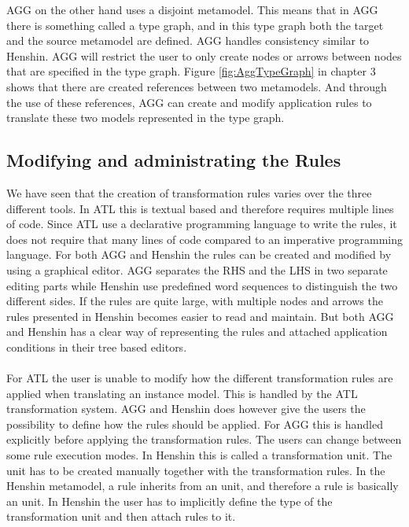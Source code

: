 \documentclass[pdftex,11pt,a4paper]{article}
\begin{document}
AGG on the other hand uses a disjoint metamodel. This means that in AGG there
is something called a type graph, and in this type graph both the target and
the source metamodel are defined. AGG handles consistency similar to
Henshin. AGG will restrict the user to only create nodes or arrows between
nodes that are specified in the type graph. Figure \ref{fig:AggTypeGraph}
in chapter 3 shows that there are created references between two metamodels. And
through the use of these references, AGG can create and modify application
rules to translate these two models represented in the type graph. 
 
\subsection{Modifying and administrating the Rules}
We have seen that the creation of transformation rules varies over the three
different tools. In ATL this is textual based and therefore requires multiple
lines of code. Since ATL use a declarative programming language to write
the rules, it does not require that many lines of code compared to 
an imperative programming language. For both AGG and Henshin the rules can be
created and modified by using a graphical editor. AGG separates the RHS and the
LHS in two separate editing parts while Henshin use predefined word sequences to
distinguish the two different sides. If the rules are quite large, with multiple
nodes and arrows the rules presented in Henshin becomes easier to read and
maintain. But both AGG and Henshin has a clear way of representing the rules and
attached application conditions in their tree based editors. 
\paragraph{}
For ATL the user is unable to modify how the different transformation
rules are applied when translating an instance model. This is handled by the ATL
transformation system. AGG and Henshin does however give the users the
possibility to define how the rules should be applied. For AGG this is handled
explicitly before applying the transformation rules. The users can change
between some rule execution modes. In Henshin this is called a
transformation unit. The unit has to be created manually together with the
transformation rules. In the Henshin metamodel, a rule inherits from an unit,
and therefore a rule is basically an unit. In Henshin the user has to implicitly define the
type of the transformation unit and then attach rules to it.
\end{document}
